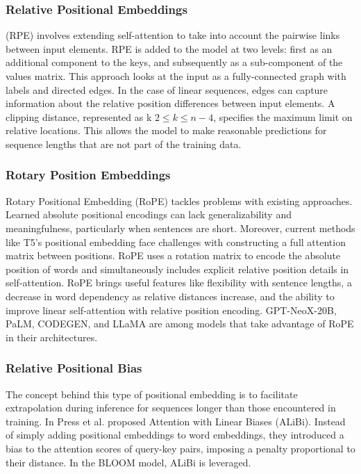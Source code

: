 \documentclass[conference]{IEEEtran}
\begin{document}
\subsubsection{\textbf{Relative Positional Embeddings}} (RPE) \cite{shaw2018self} involves extending self-attention to take into account the pairwise links between input elements. RPE is added to the model at two levels: first as an additional component to the keys, and subsequently as a sub-component of the values matrix.  This approach looks at the input as a fully-connected graph with labels and directed edges. In the case of linear sequences, edges can capture information about the relative position differences between input elements.  A clipping distance, represented as k $2 \leq k \leq n - 4$, specifies the maximum limit on relative locations. This allows the model to make reasonable predictions for sequence lengths that are not part of the training data.

\subsubsection{\textbf{Rotary Position Embeddings}}
Rotary Positional Embedding (RoPE) \cite{rope-paper} tackles problems with existing approaches. 
Learned absolute positional encodings can lack generalizability and meaningfulness, particularly when sentences are short. Moreover, current methods like T5's positional embedding face challenges with constructing a full attention matrix between positions.  RoPE uses a rotation matrix to encode the absolute position of words and simultaneously includes explicit relative position details in self-attention. RoPE brings useful features like flexibility with sentence lengths, a decrease in word dependency as relative distances increase, and the ability to improve linear self-attention with relative position encoding. GPT-NeoX-20B, PaLM, CODEGEN, and LLaMA are among models that take advantage of RoPE in their architectures.

\subsubsection{\textbf{Relative Positional Bias}}
The concept behind this type of positional embedding is to facilitate extrapolation during inference for sequences longer than those encountered in training.
In \cite{press2021train} Press et al.  proposed Attention with Linear Biases (ALiBi). Instead of simply adding positional embeddings to word embeddings, they introduced a bias to the attention scores of query-key pairs, imposing a penalty proportional to their distance. In the BLOOM model, ALiBi is leveraged. 
\end{document}
